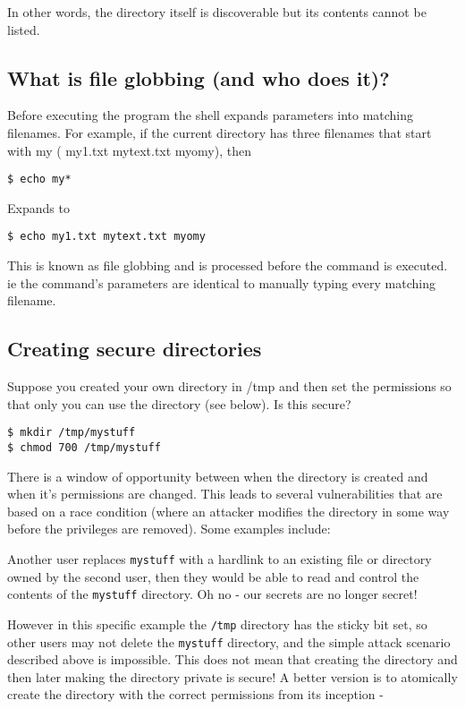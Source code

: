 In other words, the directory itself is discoverable but its contents
cannot be listed.

\subsection{What is file globbing (and who does
it)?}\label{what-is-file-globbing-and-who-does-it}

Before executing the program the shell expands parameters into matching
filenames. For example, if the current directory has three filenames
that start with my ( my1.txt mytext.txt myomy), then

\begin{verbatim}
$ echo my*
\end{verbatim}

Expands to

\begin{verbatim}
$ echo my1.txt mytext.txt myomy
\end{verbatim}

This is known as file globbing and is processed before the command is
executed. ie the command's parameters are identical to manually typing
every matching filename.

\subsection{Creating secure
directories}\label{creating-secure-directories}

Suppose you created your own directory in /tmp and then set the
permissions so that only you can use the directory (see below). Is this
secure?

\begin{verbatim}
$ mkdir /tmp/mystuff
$ chmod 700 /tmp/mystuff
\end{verbatim}

There is a window of opportunity between when the directory is created
and when it's permissions are changed. This leads to several
vulnerabilities that are based on a race condition (where an attacker
modifies the directory in some way before the privileges are removed).
Some examples include:

Another user replaces \texttt{mystuff} with a hardlink to an existing
file or directory owned by the second user, then they would be able to
read and control the contents of the \texttt{mystuff} directory. Oh no -
our secrets are no longer secret!

However in this specific example the \texttt{/tmp} directory has the
sticky bit set, so other users may not delete the \texttt{mystuff}
directory, and the simple attack scenario described above is impossible.
This does not mean that creating the directory and then later making the
directory private is secure! A better version is to atomically create
the directory with the correct permissions from its inception -

